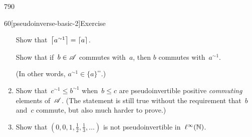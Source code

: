 \begin{parsec}{790}
\begin{point}{60}[pseudoinverse-basic-2]{Exercise}
\begin{enumerate}
Show that~$\left\lceil a^{\sim1}\right\rceil=\left\lceil a\right\rceil$.

Show that if~$b\in \mathscr{A}$ commutes with~$a$,
then $b$ commutes with~$a^{\sim 1}$.

(In other words, $a^{\sim1}\in\{a\}^{\square\square}$.)
\item
Show that~$c^{\sim1}\leq b^{\sim1}$
when~$b\leq c$ are pseudoinvertible positive \emph{commuting}
elements of~$\mathscr{A}$.
(The statement is still true without
the requirement that~$b$ and~$c$ commute,
but also much harder to prove.)


\item
Show that $(0,0,1,\frac{1}{2}, \frac{1}{3},\dotsc)$
        is not pseudoinvertible in~$\ell^\infty(\mathbb{N})$.
\end{enumerate}
\end{point}
\end{parsec}
